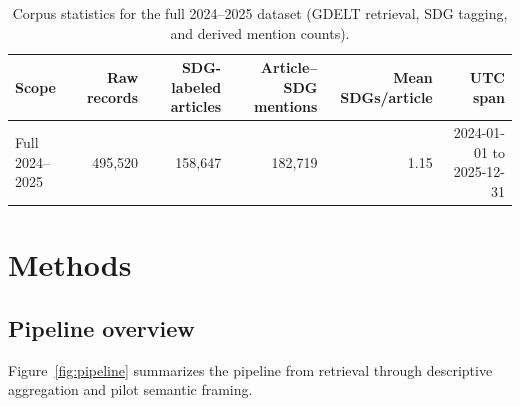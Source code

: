\documentclass[11pt]{article}
\begin{document}
\begin{table}[H]
\centering
\caption{Corpus statistics for the full 2024--2025 dataset (GDELT retrieval, SDG tagging, and derived mention counts).}
\label{tab:corpus_stats}
\begin{tabular}{lrrrrr}
\toprule
Scope & Raw records & SDG-labeled articles & Article--SDG mentions & Mean SDGs/article & UTC span \\
\midrule
Full 2024--2025 & 495{,}520 & 158{,}647 & 182{,}719 & 1.15 & 2024-01-01 to 2025-12-31 \\
\bottomrule
\end{tabular}
\end{table}

\section{Methods}
\label{sec:methods}
\subsection{Pipeline overview}
Figure~\ref{fig:pipeline} summarizes the pipeline from retrieval through descriptive aggregation and pilot semantic framing.
\end{document}
